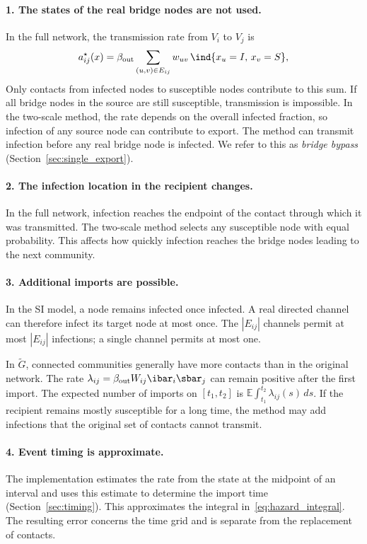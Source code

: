 \paragraph{1. The states of the real bridge nodes are not used.}
In the full network, the transmission rate from $V_i$ to $V_j$ is
\begin{equation}
\label{eq:exact_rate}
a^\star_{ij}(x)=\beta_{\mathrm{out}}\sum_{(u,v)\in E_{ij}}w_{uv}\,\ind\{x_u=I,\,x_v=S\},
\end{equation}
Only contacts from infected nodes to susceptible nodes contribute to this sum. If all bridge nodes in the source are still susceptible, transmission is impossible. In the two-scale method, the rate depends on the overall infected fraction, so infection of any source node can contribute to export. The method can transmit infection before any real bridge node is infected. We refer to this as \emph{bridge bypass} (Section~\ref{sec:single_export}).

\paragraph{2. The infection location in the recipient changes.}
In the full network, infection reaches the endpoint of the contact through which it was transmitted. The two-scale method selects any susceptible node with equal probability. This affects how quickly infection reaches the bridge nodes leading to the next community.

\paragraph{3. Additional imports are possible.}
In the SI model, a node remains infected once infected. A real directed channel can therefore infect its target node at most once. The $|E_{ij}|$ channels permit at most $|E_{ij}|$ infections; a single channel permits at most one.
\par In $\tilde G$, connected communities generally have more contacts than in the original network. The rate $\lambda_{ij}=\beta_{\mathrm{out}}W_{ij}\ibar_i\sbar_j$ can remain positive after the first import. The expected number of imports on $[t_1,t_2]$ is $\mathbb{E}\int_{t_1}^{t_2}\lambda_{ij}(s)\,ds$. If the recipient remains mostly susceptible for a long time, the method may add infections that the original set of contacts cannot transmit.

\paragraph{4. Event timing is approximate.}
The implementation estimates the rate from the state at the midpoint of an interval and uses this estimate to determine the import time (Section~\ref{sec:timing}). This approximates the integral in~\eqref{eq:hazard_integral}. The resulting error concerns the time grid and is separate from the replacement of contacts.

